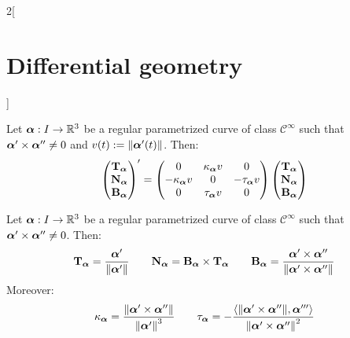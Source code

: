\documentclass[../../../main.tex]{subfiles}
\begin{document}
\begin{multicols}{2}[\section{Differential geometry}]
\begin{proposition}
  \end{proposition}
  \begin{theorem}
    Let $\vf{\alpha}:I\rightarrow\RR^3$ be a regular parametrized curve of class $\mathcal{C}^\infty$ such that $\vf{\alpha}'\times \vf{\alpha}''\ne 0$ and $v(t):=\|\vf{\alpha}'(t)\|$. Then:
    $$
      \begin{pmatrix}
        \T\alpha \\
        \N\alpha \\
        \B\alpha \\
      \end{pmatrix}'=
      \begin{pmatrix}
        0            & \ka\alpha v & 0            \\
        -\ka\alpha v & 0           & -\ta\alpha v \\
        0            & \ta\alpha v & 0
      \end{pmatrix}
      \begin{pmatrix}
        \T\alpha \\
        \N\alpha \\
        \B\alpha \\
      \end{pmatrix}
    $$
  \end{theorem}
  \begin{corollary}
    Let $\vf{\alpha}:I\rightarrow\RR^3$ be a regular parametrized curve of class $\mathcal{C}^\infty$ such that $\vf{\alpha}'\times \vf{\alpha}''\ne 0$. Then:
    $$\T\alpha=\frac{\vf{\alpha}'}{\|\vf{\alpha}'\|}\qquad\N\alpha=\B\alpha\times\T\alpha\qquad\B\alpha=\frac{\vf{\alpha}'\times\vf{\alpha}''}{\|\vf{\alpha}'\times\vf{\alpha}''\|}$$
    Moreover: $$\ka\alpha=\frac{\|\vf{\alpha}'\times\vf{\alpha}''\|}{{\|\vf{\alpha}'\|}^3}\qquad\ta\alpha=-\frac{\langle\|\vf{\alpha}'\times\vf{\alpha}''\|,\vf{\alpha}'''\rangle}{{\|\vf{\alpha}'\times\vf{\alpha}''\|}^2}$$
  \end{corollary}

\end{multicols}
\end{document}
